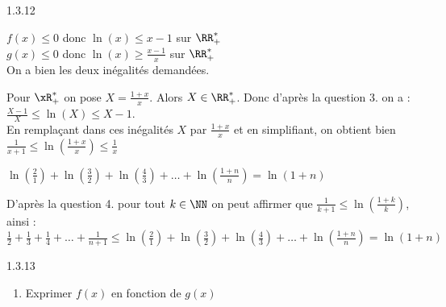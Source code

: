 \begin{Solution}{1.3.12}
	\begin{enumerate}
	\begin{minipage}{0.45\linewidth}
	\item {}
	\end{minipage}\hfill
	\begin{minipage}{0.45\linewidth}
	\item {}
	\end{minipage}
	\item $f(x)\leq0$ donc $\ln(x)\leq x-1$ sur $\RR^*_+$\\
	$g(x)\leq0$ donc $\ln(x)\geq \frac{x-1}{x}$ sur $\RR^*_+$\\
	On a bien les deux inégalités demandées.
	\item Pour $\xR^*_+$ on pose $X=\frac{1+x}{x}$. Alors $X\in\RR^*_+$. Donc d'après la question 3. on a :\\
	$\frac{X-1}{X}\leq\ln(X)\leq X-1$.\\
	En remplaçant dans ces inégalités $X$ par $\frac{1+x}{x}$ et en simplifiant, on obtient bien $\frac{1}{x+1}\leq\ln\left(\frac{1+x}{x}\right)\leq\frac{1}{x}$
	\item $\ln\left(\frac{2}{1}\right)+\ln\left(\frac{3}{2}\right)+\ln\left(\frac{4}{3}\right)+\ldots+\ln\left(\frac{1+n}{n}\right) = \ln(1+n)$
	\item D'après la question 4. pour tout $k\in\NN$ on peut affirmer que $\frac{1}{k+1}\leq\ln\left(\frac{1+k}{k}\right)$, ainsi :\\
	$\frac{1}{2}+\frac{1}{3}+\frac{1}{4}+\ldots+\frac{1}{n+1}\leq\ln\left(\frac{2}{1}\right)+\ln\left(\frac{3}{2}\right)+\ln\left(\frac{4}{3}\right)+\ldots+\ln\left(\frac{1+n}{n}\right)=\ln(1+n)$
	\end{enumerate}
\end{Solution}
\begin{Indication}{1.3.13}
	\begin{enumerate}
		\item[2.] Exprimer $f(x)$ en fonction de $g(x)$
	\end{enumerate}
\end{Indication}
